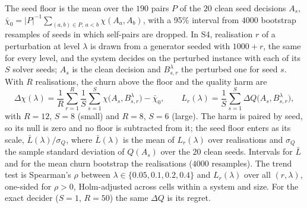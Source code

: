 \documentclass[systems,article,accept,moreauthors,pdftex]{Definitions/mdpi}
\begin{document}
The seed floor is the mean over the $190$ pairs $P$ of the $20$ clean seed decisions $A_s$,
$\bar\chi_0=|P|^{-1}\sum_{(a,b)\in P,\,a<b}\chi(A_a,A_b)$, with a 95\% interval from $4000$
bootstrap resamples of seeds in which self-pairs are dropped. In S4, realisation $r$ of a
perturbation at level $\lambda$ is drawn from a generator seeded with $1000+r$, the same for
every level, and the system decides on the perturbed instance with each of its $S$ solver
seeds; $A_s$ is the clean decision and $B_{s,r}^\lambda$ the perturbed one for seed $s$. With
$R$ realisations, the churn above the floor and the quality harm are
\begin{equation}\label{eq:above-floor}
\Delta\chi(\lambda)=\frac1R\sum_{r=1}^{R}\frac1S\sum_{s=1}^{S}\chi\bigl(A_s,B_{s,r}^{\lambda}\bigr)-\bar\chi_0,
\qquad
L_r(\lambda)=\frac1S\sum_{s=1}^{S}\Delta Q\bigl(A_s,B_{s,r}^{\lambda}\bigr),
\end{equation}
with $R=12$, $S=8$ (small) and $R=8$, $S=6$ (large). The harm is paired by seed, so its null
is zero and no floor is subtracted from it; the seed floor enters as its scale,
$\bar L(\lambda)/\sigma_Q$, where $\bar L(\lambda)$ is the mean of $L_r(\lambda)$ over
realisations and $\sigma_Q$ the sample standard deviation of $Q(A_s)$ over the $20$ clean seeds.
Intervals for $\bar L$ and for the mean churn bootstrap the realisations ($4000$ resamples).
The trend test is Spearman's $\rho$ between $\lambda\in\{0.05,0.1,0.2,0.4\}$ and $L_r(\lambda)$
over all $(r,\lambda)$, one-sided for $\rho>0$, Holm-adjusted across cells within a system
and size. For the exact decider ($S=1$, $R=50$) the same $\Delta Q$ is its regret.
\end{document}
